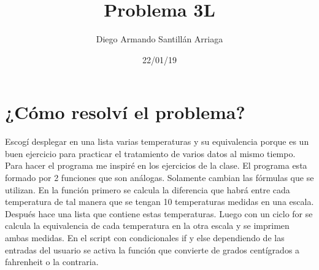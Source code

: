 \documentclass[letterpaper, 12pt, oneside]{article}%
\title{\Huge Problema 3L}
\author{Diego Armando Santillán Arriaga}
\date{22/01/19}
\begin{document}
\maketitle
\newpage
\section*{¿Cómo resolví el problema?}
Escogí desplegar en una lista varias temperaturas y su equivalencia porque es un buen ejercicio para practicar el tratamiento de varios datos al mismo tiempo. Para hacer el programa me inspiré en los ejercicios de la clase. 
El programa esta formado por 2 funciones que son análogas. Solamente cambian las fórmulas que se utilizan. En la función primero se calcula la diferencia que habrá entre cada temperatura de tal manera que se tengan 10 temperaturas medidas en una escala. Después hace una lista que contiene estas temperaturas. Luego con un ciclo for se calcula la equivalencia de cada temperatura en la otra escala y se imprimen ambas medidas. En el script con condicionales if y else dependiendo de las entradas del usuario se activa la función que convierte de grados centígrados a fahrenheit o la contraria. 
\end{document}

